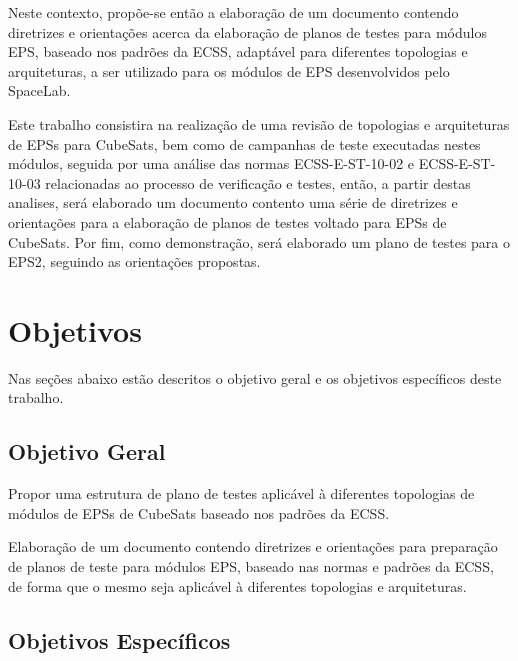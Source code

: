 Neste contexto, propõe-se então a elaboração de um documento contendo diretrizes e orientações acerca da elaboração de planos de testes para módulos \gls{EPS}, baseado nos padrões da \gls{ECSS}, adaptável para diferentes topologias e arquiteturas, a ser utilizado para os módulos de \gls{EPS} desenvolvidos pelo SpaceLab.

Este trabalho consistira na realização de uma revisão de topologias e arquiteturas de EPSs para CubeSats, bem como de campanhas de teste executadas nestes módulos, seguida por uma análise das normas ECSS-E-ST-10-02 \cite{ecss-e-st-10-02} e ECSS-E-ST-10-03 \cite{ecss-e-st-10-03} relacionadas ao processo de verificação e testes, então, a partir destas analises, será elaborado um documento contento uma série de diretrizes e orientações para a elaboração de planos de testes voltado para EPSs de CubeSats. Por fim, como demonstração, será elaborado um plano de testes para o \gls{EPS2}, seguindo as orientações propostas.

\section{Objetivos}\label{sec:objetivos}

Nas seções abaixo estão descritos o objetivo geral e os objetivos específicos deste trabalho.

\subsection{Objetivo Geral}

Propor uma estrutura de plano de testes aplicável à diferentes topologias de módulos de \gls{EPS}s de CubeSats baseado nos padrões da \gls{ECSS}.

Elaboração de um documento contendo diretrizes e orientações para preparação de planos de teste para módulos \gls{EPS}, baseado nas normas e padrões da \gls{ECSS}, de forma que o mesmo seja aplicável à diferentes topologias e arquiteturas.

\subsection{Objetivos Específicos}

